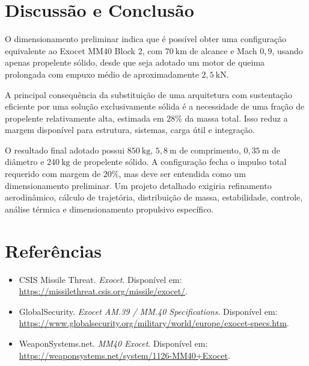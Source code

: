 \section{Discussão e Conclusão}

O dimensionamento preliminar indica que é possível obter uma configuração equivalente ao Exocet MM40 Block 2, com \(70~\text{km}\) de alcance e Mach \(0{,}9\), usando apenas propelente sólido, desde que seja adotado um motor de queima prolongada com empuxo médio de aproximadamente \(2{,}5~\text{kN}\).

A principal consequência da substituição de uma arquitetura com sustentação eficiente por uma solução exclusivamente sólida é a necessidade de uma fração de propelente relativamente alta, estimada em \(28\%\) da massa total. Isso reduz a margem disponível para estrutura, sistemas, carga útil e integração.

O resultado final adotado possui \(850~\text{kg}\), \(5{,}8~\text{m}\) de comprimento, \(0{,}35~\text{m}\) de diâmetro e \(240~\text{kg}\) de propelente sólido. A configuração fecha o impulso total requerido com margem de \(20\%\), mas deve ser entendida como um dimensionamento preliminar. Um projeto detalhado exigiria refinamento aerodinâmico, cálculo de trajetória, distribuição de massa, estabilidade, controle, análise térmica e dimensionamento propulsivo específico.

\section*{Referências}

\begin{itemize}
    \item CSIS Missile Threat. \textit{Exocet}. Disponível em: \url{https://missilethreat.csis.org/missile/exocet/}.
    \item GlobalSecurity. \textit{Exocet AM.39 / MM.40 Specifications}. Disponível em: \url{https://www.globalsecurity.org/military/world/europe/exocet-specs.htm}.
    \item WeaponSystems.net. \textit{MM40 Exocet}. Disponível em: \url{https://weaponsystems.net/system/1126-MM40+Exocet}.
\end{itemize}
